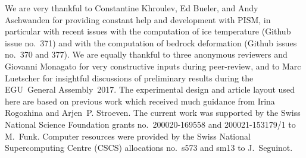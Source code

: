 \documentclass[tc, manuscript]{copernicus}
\begin{document}
\begin{acknowledgements}

    We are very thankful to Constantine Khroulev, Ed Bueler, and Andy
    Aschwanden for providing constant help and development with PISM, in
    particular with recent issues with the computation of ice temperature
    (Github issue no.~371) and with the computation of bedrock deformation
    (Github issues no.~370 and 377). We are equally thankful to three
    anonymous reviewers and Giovanni Monagato for very constructive inputs
    during peer-review, and to Marc Luetscher for insightful discussions of
    preliminary results during the EGU~General Assembly~2017. The experimental
    design and article layout used here are based on previous work which
    received much guidance from Irina Rogozhina and Arjen~P. Stroeven.
    The current work was supported by the Swiss National Science Foundation
    grants no.~200020-169558 and 200021-153179/1 to M.~Funk. Computer resources
    were provided by the Swiss National Supercomputing Centre (CSCS)
    allocations no.~s573 and sm13 to J.~Seguinot.

\end{acknowledgements}







\end{document}
